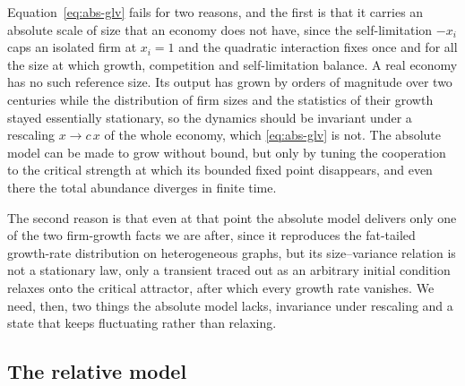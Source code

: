 Equation~\eqref{eq:abs-glv} fails for two reasons, and the first is
that it carries an absolute scale of size that an economy does not have, since the self-limitation
$-x_i$ caps an isolated firm at $x_i = 1$ and the quadratic interaction fixes once and for all the
size at which growth, competition and self-limitation balance. A real economy has no such
reference size. Its output has grown by orders of magnitude over two centuries while the
distribution of firm sizes and the statistics of their growth stayed essentially stationary, so
the dynamics should be invariant under a rescaling $x \to c\,x$ of the whole economy, which
\eqref{eq:abs-glv} is not. The absolute model can be made to grow without bound, but only by
tuning the cooperation to the critical strength at which its bounded fixed point disappears, and
even there the total abundance diverges in finite time.

The second reason is that even at that point the absolute model delivers only one of the two
firm-growth facts we are after, since it reproduces the fat-tailed growth-rate distribution on
heterogeneous graphs, but its size--variance relation is not a stationary law, only a transient
traced out as an arbitrary initial condition relaxes onto the critical attractor, after which
every growth rate vanishes. We need, then, two things the absolute model lacks, invariance under
rescaling and a state that keeps fluctuating rather than relaxing.

\subsection{The relative model}
\label{sec:relative-derivation}

